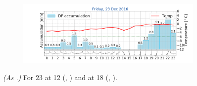 \begin{figure}[ht!]
\begin{subfigure}[b]{0.49\textwidth}
		\includegraphics[trim={4.9cm 1.cm 1.5cm 1cm},clip,
		width=\textwidth]{./fig_weathermast/T_P_U_20161223}
		\caption{} \label{fig:TPU23}
	\end{subfigure}
	\caption{\textit{(As .)} For \SI{23}{\dec} at \SI{12}{\UTC} (\protect{}, \protect{}) and at \SI{18}{\UTC} (\protect{}, \protect{}).}\label{fig:weather:23}
\end{figure}


\newpage
